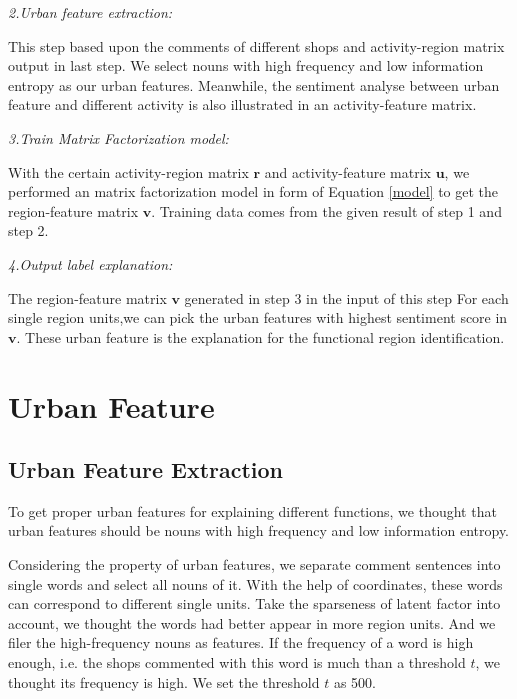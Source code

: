 \documentclass[runningheads]{llncs}
\begin{document}
\emph{2.Urban feature extraction:}

This step based upon the comments of different shops and activity-region matrix output in last step.
We select nouns with high frequency and low information entropy as our urban features.
Meanwhile, the sentiment analyse between urban feature and different activity is also illustrated in an activity-feature matrix.

\emph{3.Train Matrix Factorization model:}

With the certain activity-region matrix $\bm{r}$ and activity-feature matrix $\bm{u}$, we performed an matrix factorization model in form of Equation \ref{model} to get the region-feature matrix $\bm{v}$.
Training data comes from the given result of step 1 and step 2.

\emph{4.Output label explanation:}

The region-feature matrix $\bm{v}$ generated in step 3 in the input of this step
For each single region units,we can pick the urban features with highest sentiment score in $\bm{v}$.
These urban feature is the explanation for the functional region identification.




















\section{Urban Feature}\label{sec:extraction}

\subsection{Urban Feature Extraction}
To get proper urban features for explaining different functions, we thought that urban features should be nouns with high frequency and low information entropy.

Considering the property of urban features, we separate comment sentences into single words and select all nouns of it.
With the help of coordinates, these words can correspond to different single units.
Take the sparseness of latent factor into account, we thought the words had better appear in more region units.
And we filer the high-frequency nouns as features.
If the frequency of a word is high enough, i.e. the shops commented with this word is much than a threshold $t$, we thought its frequency is high.
We set the threshold $t$ as 500.
\end{document}
